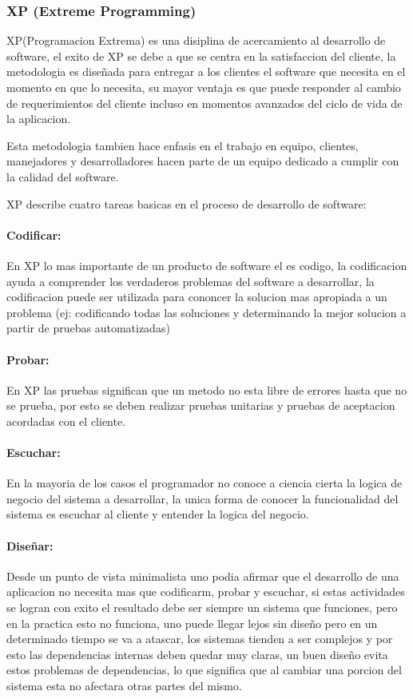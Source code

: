 \subsubsection*{XP (Extreme Programming) \cite{xp} }

XP(Programacion Extrema) es una disiplina de acercamiento al desarrollo de software, el exito de XP se debe a que se centra en la satisfaccion del cliente, la metodologia es diseñada para entregar a los clientes el software que necesita en el momento en que lo necesita, su mayor ventaja es que puede responder al cambio de requerimientos del cliente incluso en momentos avanzados del ciclo de vida de la aplicacion.

Esta metodologia tambien hace enfasis en el trabajo en equipo, clientes, manejadores y desarrolladores hacen parte de un equipo dedicado a cumplir con la calidad del software.

XP describe cuatro tareas basicas en el proceso de desarrollo de software:

\paragraph{Codificar:} En XP lo mas importante de un producto de software el es codigo, la codificacion ayuda a comprender los verdaderos problemas del software a desarrollar, la codificacion puede ser utilizada para cononcer la solucion mas apropiada a un problema (ej: codificando todas las soluciones y determinando la mejor solucion a partir de pruebas automatizadas)

\paragraph{Probar:} En XP las pruebas significan que un metodo no esta libre de errores hasta que no se prueba, por esto se deben realizar pruebas unitarias y pruebas de aceptacion acordadas con el cliente.

\paragraph{Escuchar:} En la mayoria de los casos el programador no conoce a ciencia cierta la logica de negocio del sistema a desarrollar, la unica forma de conocer la funcionalidad del sistema es escuchar al cliente y entender la logica del negocio.

\paragraph{Diseñar:} Desde un punto de vista minimalista uno podia afirmar que el desarrollo de una aplicacion no necesita mas que codificarm, probar y escuchar, si estas actividades se logran con exito el resultado debe ser siempre un sistema que funciones, pero en la practica esto no funciona, uno puede llegar lejos sin diseño pero en un determinado tiempo se va a atascar, los sistemas tienden a ser complejos y por esto las dependencias internas deben quedar muy claras, un buen diseño evita estos problemas de dependencias, lo que significa que al cambiar una porcion del sistema esta no afectara otras partes del mismo.

